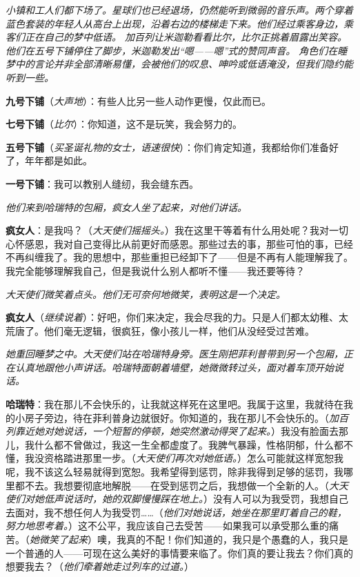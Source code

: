 \documentclass[lang=cn,newtx,12pt,scheme=chinese]{elegantbook}
\begin{document}
\textit{小镇和工人们都下场了。星球们也已经退场，仍然能听到微弱的音乐声。两个穿着蓝色套装的年轻人从高台上出现，沿着右边的楼梯走下来。他们经过乘客身边，乘客们正在自己的梦中低语。
    \newline
    加百列让米迦勒看看比尔，比尔正挑着眉露出笑容。他们在五号下铺停住了脚步，米迦勒发出“嗯——嗯”式的赞同声音。
    \newline
    角色们在睡梦中的言论并非全部清晰易懂，会被他们的叹息、呻吟或低语淹没，但我们隐约能听到一些。}


\textbf{九号下铺}（\textit{大声地}）：有些人比另一些人动作更慢，仅此而已。

\textbf{七号下铺}（\textit{比尔}）：你知道，这不是玩笑，我会努力的。

\textbf{五号下铺}（\textit{买圣诞礼物的女士，语速很快}）：你们肯定知道，我都给你们准备好了，年年都是如此。

\textbf{一号下铺}：我可以教别人缝纫，我会缝东西。

\textit{他们来到哈瑞特的包厢，疯女人坐了起来，对他们讲话。}

\textbf{疯女人}：是我吗？（\textit{大天使们摇摇头。}）我在这里干等着有什么用处呢？我对一切心怀感恩，我对自己变得比从前更好而感恩。那些过去的事，那些可怕的事，已经不再纠缠我了。我的思想中，那些重担已经卸下了——但是不再有人能理解我了。我完全能够理解我自己，但是我说什么别人都听不懂——我还要等待？

\textit{大天使们微笑着点头。他们无可奈何地微笑，表明这是一个决定。}

\textbf{疯女人}（\textit{继续说着}）：好吧，你们来决定，我会尽我的力。只是人们都太幼稚、太荒唐了。他们毫无逻辑，很疯狂，像小孩儿一样，他们从没经受过苦难。

\textit{她重回睡梦之中。大天使们站在哈瑞特身旁。医生刚把菲利普带到另一个包厢，正在认真地跟他小声讲话。哈瑞特面朝着墙壁，她微微转过头，面对着车顶开始说话。}

\textbf{哈瑞特}：我在那儿不会快乐的，让我就这样死在这里吧。我属于这里，我就待在我的小房子旁边，待在菲利普身边就很好。你知道的，我在那儿不会快乐的。（\textit{加百列靠近她对她说话，一个短暂的停顿，她突然激动得哭了起来。}）我没有脸面去那儿，我什么都不曾做过，我这一生全都虚度了。我脾气暴躁，性格阴郁，什么都不懂，我没资格踏进那里一步。（\textit{大天使们再次对她低语。}）怎么可能就这样宽恕我呢，我不该这么轻易就得到宽恕。我希望得到惩罚，除非我得到足够的惩罚，我哪里都不去。我想要彻底地解脱——在受到惩罚之后，我想做一个全新的人。（\textit{大天使们对她低声说话时，她的双脚慢慢踩在地上。}）没有人可以为我受罚，我想自己去面对，我不想任何人为我受罚……（\textit{他们对她说话，她坐在那里盯着自己的鞋，努力地思考着。}）这不公平，我应该自己去受苦——如果我可以承受那么重的痛苦。（\textit{她微笑了起来}）噢，我真的不配！你们知道的，我只是个愚蠢的人，我只是一个普通的人——可现在这么美好的事情要来临了。你们真的要让我去？你们真的想要我去？（\textit{他们牵着她走过列车的过道。}）
\end{document}
